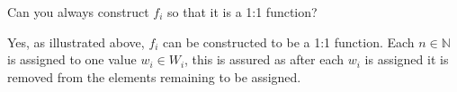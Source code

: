 \documentclass[12pt]{article}
\begin{document}
\begin{enumerate}
\begin{enumerate}
\begin{description}
			
		\end{description}
Can you always construct $f_i$ so that it is a 1:1 function?

Yes, as illustrated above, $f_i$ can be constructed to be a 1:1 function. Each  $n \in \mathbb{N}$ is assigned to one value $w_{i} \in W_{i}$, this is assured as after each $w_{i}$ is assigned it is removed from the elements remaining to be assigned. 
  \end{enumerate}

\end{enumerate}
\end{document}
